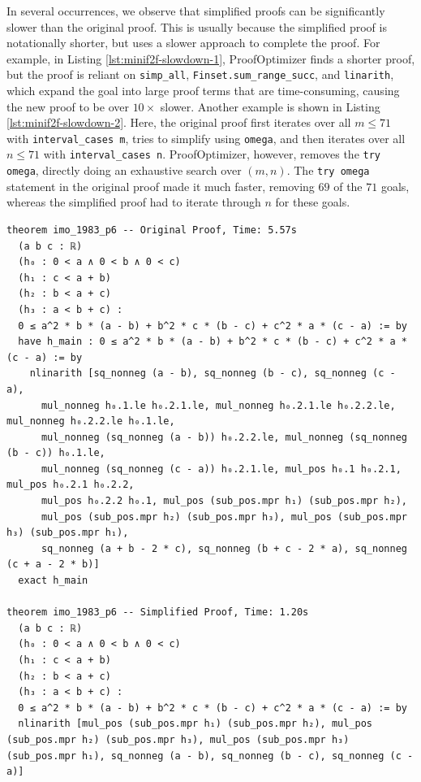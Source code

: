 In several occurrences, we observe that simplified proofs can be significantly slower than the original proof. This is usually because the simplified proof is notationally shorter, but uses a slower approach to complete the proof. For example, in Listing \ref{lst:minif2f-slowdown-1}, ProofOptimizer finds a shorter proof, but the proof is reliant on \texttt{simp\_all}, \texttt{Finset.sum\_range\_succ}, and \texttt{linarith}, which expand the goal into large proof terms that are time-consuming, causing the new proof to be over $10\times$ slower. Another example is shown in Listing \ref{lst:minif2f-slowdown-2}. Here, the original proof first iterates over all $m \le 71$ with \texttt{interval\_cases m}, tries to simplify using \texttt{omega}, and then iterates over all $n \le 71$ with \texttt{interval\_cases n}. ProofOptimizer, however, removes the \texttt{try omega}, directly doing an exhaustive search over $(m, n)$. The \texttt{try omega} statement in the original proof made it much faster, removing $69$ of the $71$ goals, whereas the simplified proof had to iterate through $n$ for these goals.

\begin{tcolorbox}[colback=lightblue, boxrule=0pt, arc=5pt, outer arc=5pt, after skip=10pt plus 2pt]
\begin{lstlisting}[caption={Example of Speedup after Simplification (orig: 5.6s, new: 1.2s)},label={lst:minif2f-speedup-1}, captionpos=t, language=lean, breaklines=true, style=mystyle]
theorem imo_1983_p6 -- Original Proof, Time: 5.57s
  (a b c : ℝ)
  (h₀ : 0 < a ∧ 0 < b ∧ 0 < c)
  (h₁ : c < a + b)
  (h₂ : b < a + c)
  (h₃ : a < b + c) :
  0 ≤ a^2 * b * (a - b) + b^2 * c * (b - c) + c^2 * a * (c - a) := by
  have h_main : 0 ≤ a^2 * b * (a - b) + b^2 * c * (b - c) + c^2 * a * (c - a) := by
    nlinarith [sq_nonneg (a - b), sq_nonneg (b - c), sq_nonneg (c - a),
      mul_nonneg h₀.1.le h₀.2.1.le, mul_nonneg h₀.2.1.le h₀.2.2.le, mul_nonneg h₀.2.2.le h₀.1.le,
      mul_nonneg (sq_nonneg (a - b)) h₀.2.2.le, mul_nonneg (sq_nonneg (b - c)) h₀.1.le,
      mul_nonneg (sq_nonneg (c - a)) h₀.2.1.le, mul_pos h₀.1 h₀.2.1, mul_pos h₀.2.1 h₀.2.2,
      mul_pos h₀.2.2 h₀.1, mul_pos (sub_pos.mpr h₁) (sub_pos.mpr h₂),
      mul_pos (sub_pos.mpr h₂) (sub_pos.mpr h₃), mul_pos (sub_pos.mpr h₃) (sub_pos.mpr h₁),
      sq_nonneg (a + b - 2 * c), sq_nonneg (b + c - 2 * a), sq_nonneg (c + a - 2 * b)]
  exact h_main

theorem imo_1983_p6 -- Simplified Proof, Time: 1.20s
  (a b c : ℝ)
  (h₀ : 0 < a ∧ 0 < b ∧ 0 < c)
  (h₁ : c < a + b)
  (h₂ : b < a + c)
  (h₃ : a < b + c) :
  0 ≤ a^2 * b * (a - b) + b^2 * c * (b - c) + c^2 * a * (c - a) := by
  nlinarith [mul_pos (sub_pos.mpr h₁) (sub_pos.mpr h₂), mul_pos (sub_pos.mpr h₂) (sub_pos.mpr h₃), mul_pos (sub_pos.mpr h₃) (sub_pos.mpr h₁), sq_nonneg (a - b), sq_nonneg (b - c), sq_nonneg (c - a)]
\end{lstlisting}
\end{tcolorbox}


